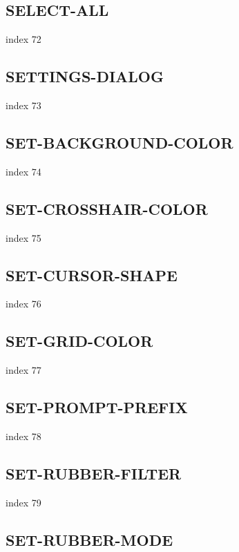 \documentclass[11pt]{report}
\begin{document}
\subsection{SELECT-ALL}

index 72

\subsection{SETTINGS-DIALOG}

index 73

\subsection{SET-BACKGROUND-COLOR}

index 74

\subsection{SET-CROSSHAIR-COLOR}

index 75

\subsection{SET-CURSOR-SHAPE}

index 76

\subsection{SET-GRID-COLOR}

index 77

\subsection{SET-PROMPT-PREFIX}

index 78

\subsection{SET-RUBBER-FILTER}

index 79

\subsection{SET-RUBBER-MODE}
\end{document}
